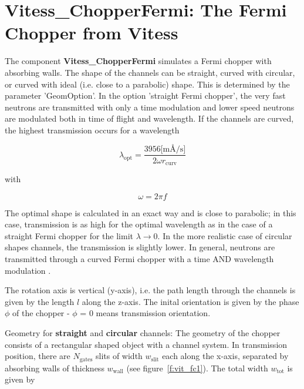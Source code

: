 
\section{Vitess\_ChopperFermi: The Fermi Chopper from Vitess}
\label{s:vit_fc}



The component \textbf{Vitess\_ChopperFermi} simulates a Fermi chopper with absorbing walls.
The shape of the channels can be straight, curved with circular, or curved with ideal
(i.e. close to a parabolic) shape.
This is determined by the parameter 'GeomOption'. In the option 'straight Fermi
chopper', the very fast neutrons are transmitted with only a time modulation and lower
speed neutrons are modulated both in time of flight and wavelength.
If the channels are curved, the highest transmission occurs for a wavelength

\begin{equation}
\lambda_\textrm{opt} = \frac{3956 \textrm{[m\AA/s]}}{2 \omega r_\textrm{curv}}
\end{equation}

with

\begin{equation}
\omega = 2 \pi f
\end{equation}

The optimal shape is calculated in an exact way and is close to parabolic; in this
case, transmission is as high for the optimal wavelength as in the case of a straight
Fermi chopper for the limit $\lambda \rightarrow 0$.
In the more realistic case of circular shapes channels, the transmission is slightly
lower. In general, neutrons are transmitted through a curved Fermi chopper with a time
AND wavelength modulation .

The rotation axis is vertical (y-axis), i.e. the path length through the channels is
given by the length $l$ along the z-axis. The inital orientation is given by the phase
$\phi$ of the chopper - $\phi$ = 0 means transmission orientation.

Geometry for \textbf{straight} and \textbf{circular} channels:
The geometry of the chopper consists of a rectangular shaped object with a channel
system. In transmission position, there are $N_\textrm{gates}$ slits of width $w_\textrm{slit}$
each along the x-axis, separated by absorbing walls of thickness $w_\textrm{wall}$
(see figure~\ref{f:vit_fc1}). The total width $w_\textrm{tot}$ is given by

